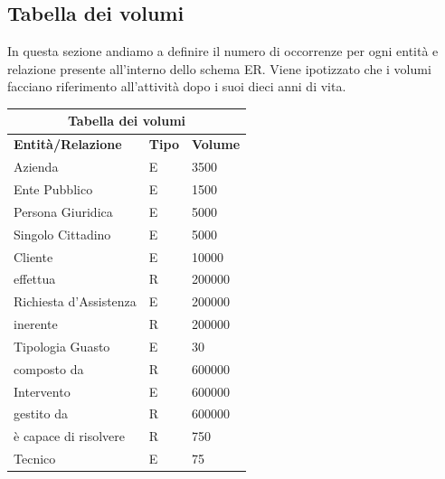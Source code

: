 \documentclass[legalpaper]{article}
\begin{document}
	\subsection{Tabella dei volumi}
		In questa sezione andiamo a definire il numero di occorrenze per ogni entità e relazione presente all'interno dello schema ER. Viene ipotizzato che i volumi facciano riferimento all'attività dopo i suoi dieci anni di vita.\\
		\newline
		\renewcommand\arraystretch{2}
		\begin{tabular}{ |p{5cm}|p{2cm}|p{5cm}| }
			\hline
			\multicolumn{3}{|c|}{\textbf{Tabella dei volumi}} \\
			\hline
			\textbf{Entità/Relazione} & \textbf{Tipo} & \textbf{Volume} \\
			\hline
			Azienda & E & 3500 \\ \hline
			Ente Pubblico & E & 1500 \\ \hline
			Persona Giuridica & E & 5000 \\ \hline
			Singolo Cittadino & E & 5000 \\ \hline
			Cliente & E & 10000 \\ \hline
			effettua & R & 200000 \\ \hline
			Richiesta d'Assistenza & E & 200000 \\ \hline
			inerente & R & 200000 \\ \hline
			Tipologia Guasto & E & 30 \\ \hline
			composto da & R & 600000 \\ \hline
			Intervento & E & 600000 \\ \hline
			gestito da & R & 600000 \\ \hline
			è capace di risolvere & R & 750 \\ \hline
			Tecnico & E & 75 \\ \hline
		\end{tabular}

\newpage	
\end{document}
